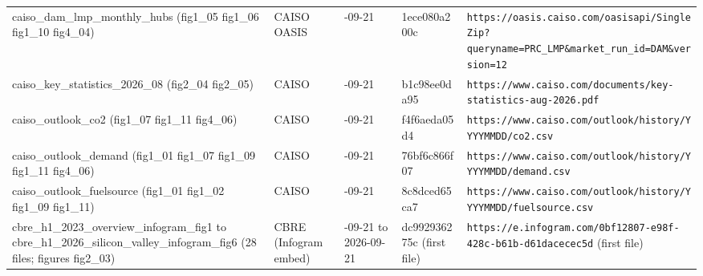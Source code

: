 \begin{longtable}{>{\raggedright\arraybackslash}p{3.0cm}>{\raggedright\arraybackslash}p{1.5cm}>{\raggedright\arraybackslash}p{1.4cm}>{\raggedright\arraybackslash}p{2.0cm}>{\raggedright\arraybackslash}p{6.0cm}}
caiso\_\allowbreak{}dam\_\allowbreak{}lmp\_\allowbreak{}monthly\_\allowbreak{}hubs (fig1\_\allowbreak{}05 fig1\_\allowbreak{}06 fig1\_\allowbreak{}10 fig4\_\allowbreak{}04) & CAISO OASIS & 2026-09-21 & 1ece080a200c & \texttt{https:\allowbreak{}/\allowbreak{}/\allowbreak{}oasis.\allowbreak{}caiso.\allowbreak{}com/\allowbreak{}oasisapi/\allowbreak{}SingleZip?\allowbreak{}queryname=\allowbreak{}PRC\_\allowbreak{}LMP\&\allowbreak{}market\_\allowbreak{}run\_\allowbreak{}id=\allowbreak{}DAM\&\allowbreak{}version=\allowbreak{}12} \\
caiso\_\allowbreak{}key\_\allowbreak{}statistics\_\allowbreak{}2026\_\allowbreak{}08 (fig2\_\allowbreak{}04 fig2\_\allowbreak{}05) & CAISO & 2026-09-21 & b1c98ee0da95 & \texttt{https:\allowbreak{}/\allowbreak{}/\allowbreak{}www.\allowbreak{}caiso.\allowbreak{}com/\allowbreak{}documents/\allowbreak{}key-\allowbreak{}statistics-\allowbreak{}aug-\allowbreak{}2026.\allowbreak{}pdf} \\
caiso\_\allowbreak{}outlook\_\allowbreak{}co2 (fig1\_\allowbreak{}07 fig1\_\allowbreak{}11 fig4\_\allowbreak{}06) & CAISO & 2026-09-21 & f4f6aeda05d4 & \texttt{https:\allowbreak{}/\allowbreak{}/\allowbreak{}www.\allowbreak{}caiso.\allowbreak{}com/\allowbreak{}outlook/\allowbreak{}history/\allowbreak{}YYYYMMDD/\allowbreak{}co2.\allowbreak{}csv} \\
caiso\_\allowbreak{}outlook\_\allowbreak{}demand (fig1\_\allowbreak{}01 fig1\_\allowbreak{}07 fig1\_\allowbreak{}09 fig1\_\allowbreak{}11 fig4\_\allowbreak{}06) & CAISO & 2026-09-21 & 76bf6c866f07 & \texttt{https:\allowbreak{}/\allowbreak{}/\allowbreak{}www.\allowbreak{}caiso.\allowbreak{}com/\allowbreak{}outlook/\allowbreak{}history/\allowbreak{}YYYYMMDD/\allowbreak{}demand.\allowbreak{}csv} \\
caiso\_\allowbreak{}outlook\_\allowbreak{}fuelsource (fig1\_\allowbreak{}01 fig1\_\allowbreak{}02 fig1\_\allowbreak{}09 fig1\_\allowbreak{}11) & CAISO & 2026-09-21 & 8c8dced65ca7 & \texttt{https:\allowbreak{}/\allowbreak{}/\allowbreak{}www.\allowbreak{}caiso.\allowbreak{}com/\allowbreak{}outlook/\allowbreak{}history/\allowbreak{}YYYYMMDD/\allowbreak{}fuelsource.\allowbreak{}csv} \\
cbre\_\allowbreak{}h1\_\allowbreak{}2023\_\allowbreak{}overview\_\allowbreak{}infogram\_\allowbreak{}fig1 to cbre\_\allowbreak{}h1\_\allowbreak{}2026\_\allowbreak{}silicon\_\allowbreak{}valley\_\allowbreak{}infogram\_\allowbreak{}fig6 (28 files; figures fig2\_\allowbreak{}03) & CBRE \allowbreak{}(Infogram embed)\allowbreak{} & 2026-09-21 to 2026-09-21 & dc992936275c (first file) & \texttt{https:\allowbreak{}/\allowbreak{}/\allowbreak{}e.\allowbreak{}infogram.\allowbreak{}com/\allowbreak{}0bf12807-\allowbreak{}e98f-\allowbreak{}428c-\allowbreak{}b61b-\allowbreak{}d61dacecec5d} (first file) \\

\end{longtable}
